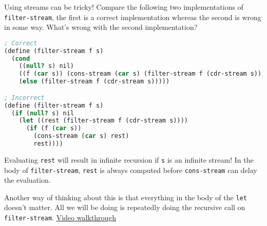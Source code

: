 \question Using streams can be tricky! Compare the following two
implementations of \texttt{filter-stream}, the first is a correct
implementation whereas the second is wrong in some way. What's wrong with the
second implementation?

\begin{lstlisting}[language=Scheme]
; Correct
(define (filter-stream f s)
  (cond
    ((null? s) nil)
    ((f (car s)) (cons-stream (car s) (filter-stream f (cdr-stream s))))
    (else (filter-stream f (cdr-stream s)))))

; Incorrect
(define (filter-stream f s)
  (if (null? s) nil
    (let ((rest (filter-stream f (cdr-stream s))))
      (if (f (car s))
        (cons-stream (car s) rest)
        rest))))
\end{lstlisting}
\begin{solution}[0.0in]
Evaluating \texttt{rest} will result in infinite recursion if \texttt{s} is an
infinite stream! In the body of \texttt{filter-stream}, \texttt{rest} is always
computed before \texttt{cons-stream} can delay the evaluation.

Another way of thinking about this is that everything in the body of the
\texttt{let} doesn't matter. All we will be doing is repeatedly doing the
recursive call on \texttt{filter-stream}.
\href{https://youtu.be/TGSYZvoIMnE?t=3m39s}{Video walkthrough}
\end{solution}
